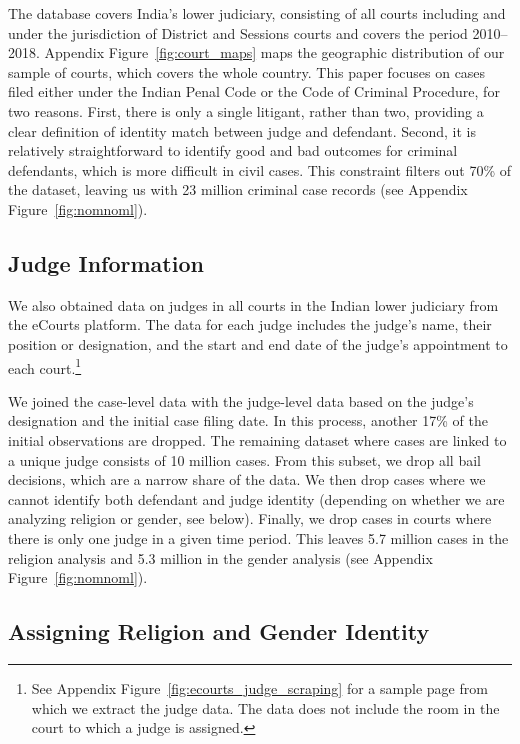 \documentclass[12pt,english]{article}
\begin{document}
The database covers India's lower judiciary, consisting of all courts including and under the jurisdiction of District and Sessions courts and covers the period 2010--2018. Appendix Figure~\ref{fig:court_maps} maps the geographic distribution of our sample of courts, which covers the whole country. This paper focuses on cases filed either under the Indian Penal Code or the Code of Criminal Procedure, for two reasons. First, there is only a single litigant, rather than two, providing a clear definition of identity match between judge and defendant. Second, it is relatively straightforward to identify good and bad outcomes for criminal defendants, which is more difficult in civil cases. This constraint filters out 70\% of the dataset, leaving us with 23 million criminal case records (see Appendix Figure~\ref{fig:nomnoml}). 

\subsection{Judge Information}

We also obtained data on judges in all courts in the Indian lower judiciary from the eCourts platform. The data for each judge includes the judge's name, their position or designation, and the start and end date of the judge's appointment to each court.\footnote{See Appendix Figure~\ref{fig:ecourts_judge_scraping} for a sample page from which we extract the judge data. The data does not include the room in the court to which a judge is assigned.}

We joined the case-level data with the judge-level data based on the judge's designation and the initial case filing date. In this process, another 17\% of the initial observations are dropped. The remaining dataset where cases are linked to a unique judge consists of 10 million cases. From this subset, we drop all bail decisions, which are a narrow share of the data. We then drop cases where we cannot identify both defendant and judge identity (depending on whether we are analyzing religion or gender, see below). Finally, we drop cases in courts where there is only one judge in a given time period. This leaves 5.7 million cases in the religion analysis and 5.3 million in the gender analysis (see Appendix Figure~\ref{fig:nomnoml}).

\subsection{Assigning Religion and Gender Identity}
\end{document}
